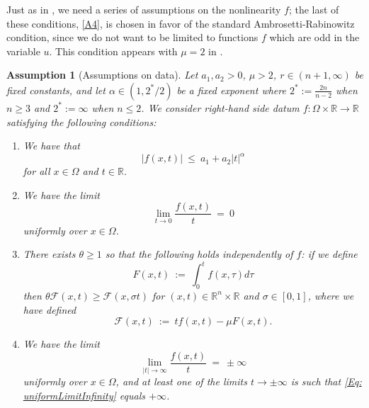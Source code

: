 \documentclass[11pt]{amsart}   	%
\theoremstyle{plain}
\numberwithin{equation}{section}
\newtheorem{assumption}[thm]{Assumption}
\def\al{\alpha}
\def\Om{\Omega}
\def\sig{\sigma}
\def\th{\theta}
\def\R{\mathbb{R}}
\begin{document}
Just as in \cite{siktar2024superlinear}, we need a series of assumptions on the nonlinearity $f$; the last of these conditions, \ref{A4}, is chosen in favor of the standard Ambrosetti-Rabinowitz condition, since we do not want to be limited to functions $f$ which are odd in the variable $u$. This condition appears with $\mu = 2$ in \cite{torres2016existence}.

\begin{assumption}[Assumptions on data]\label{Assump: AdmissibleControls}
     Let $a_1, a_2 > 0$, $\mu > 2$, $r \in (n + 1, \infty)$ be fixed constants, and let $\al \in (1, 2^*/2)$ be a fixed exponent where $2^* := \frac{2n}{n - 2}$ when $n \geq 3$ and $2^* := \infty$ when $n \leq 2$. 
     We consider right-hand side datum $f: \Om \times \R \rightarrow \R$ satisfying the following conditions:
    \begin{enumerate}[label=\textbf{A\arabic*}]
        \item \label{A2} We have that 
        \begin{equation}\label{Eq: fGrowth}
            |f(x, t)| \ \leq \ a_1 + a_2|t|^{\al}
        \end{equation}
        for all $x \in \Om$ and $t \in \R$.
        \item\label{A3} We have the limit
        \begin{equation}\label{Eq: uniformLimit}
            \lim_{t \rightarrow 0}\frac{f(x, t)}{t} \ = \ 0
        \end{equation}
        uniformly over $x \in \Om$.
        \item\label{A4} There exists $\th \geq 1$ so that the following holds independently of $f$: if we define 
        \begin{equation}\label{Eq: Gantideriv}
            F(x, t) \ := \ \int^{t}_{0}f(x, \tau)d\tau
        \end{equation}
        then $\th\mathcal{F}(x, t) \geq \mathcal{F}(x, \sig t)$ for $(x, t) \in \R^n \times \R$ and $\sig \in [0, 1]$, where we have defined
        \begin{equation}\label{Eq: ScrFDef}
            \mathcal{F}(x, t) \ := \ tf(x, t) - \mu F(x, t).
        \end{equation}
        \item\label{A5} We have the limit
        \begin{equation}\label{Eq: uniformLimitInfinity}
            \lim_{|t| \rightarrow \infty}\frac{f(x, t)}{t} \ = \ \pm \infty
        \end{equation}
        uniformly over $x \in \Om$, and at least one of the limits $t \rightarrow \pm \infty$ is such that \eqref{Eq: uniformLimitInfinity} equals $+\infty$.
    \end{enumerate}
\end{assumption}
\end{document}
